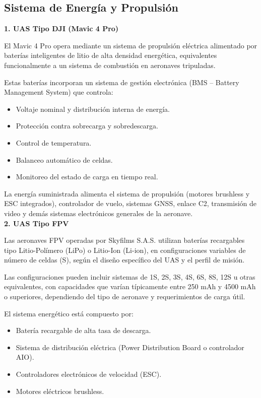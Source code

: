 \subsection{Sistema de Energía y Propulsión}

\textbf{1. UAS Tipo DJI (Mavic 4 Pro)}

El Mavic 4 Pro opera mediante un sistema de propulsión eléctrica alimentado por baterías inteligentes de litio de alta densidad energética, equivalentes funcionalmente a un sistema de combustión en aeronaves tripuladas.

Estas baterías incorporan un sistema de gestión electrónica (BMS – Battery Management System) que controla:

\begin{itemize}
    \item Voltaje nominal y distribución interna de energía.
    \item Protección contra sobrecarga y sobredescarga.
    \item Control de temperatura.
    \item Balanceo automático de celdas.
    \item Monitoreo del estado de carga en tiempo real.
\end{itemize}

La energía suministrada alimenta el sistema de propulsión (motores brushless y ESC integrados), controlador de vuelo, sistemas GNSS, enlace C2, transmisión de video y demás sistemas electrónicos generales de la aeronave. \\

\textbf{2. UAS Tipo FPV}

Las aeronaves FPV operadas por Skyfilms S.A.S. utilizan baterías recargables tipo Litio-Polímero (LiPo) o Litio-Ion (Li-ion), en configuraciones variables de número de celdas (S), según el diseño específico del UAS y el perfil de misión.

Las configuraciones pueden incluir sistemas de 1S, 2S, 3S, 4S, 6S, 8S, 12S u otras equivalentes, con capacidades que varían típicamente entre 250 mAh y 4500 mAh o superiores, dependiendo del tipo de aeronave y requerimientos de carga útil.

El sistema energético está compuesto por:

\begin{itemize}
    \item Batería recargable de alta tasa de descarga.
    \item Sistema de distribución eléctrica (Power Distribution Board o controlador AIO).
    \item Controladores electrónicos de velocidad (ESC).
    \item Motores eléctricos brushless.
\end{itemize}

